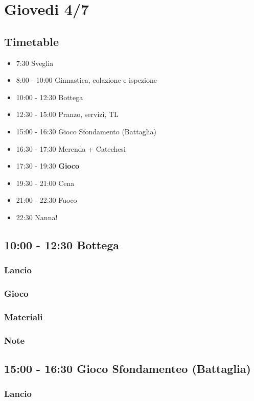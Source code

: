 \documentclass[../main.tex]{subfiles}
\begin{document}
   \section{Giovedi 4/7}
   \subsection{Timetable}
   \begin{itemize}
        \item 7:30 Sveglia
        \item 8:00 - 10:00 Ginnastica, colazione e ispezione
        \item 10:00 - 12:30 Bottega
        \item 12:30 - 15:00 Pranzo, servizi, TL
        \item 15:00 - 16:30 Gioco Sfondamento (Battaglia)
        \item 16:30 - 17:30 Merenda + Catechesi
        \item 17:30 - 19:30 \textbf{Gioco}
        \item 19:30 - 21:00 Cena
        \item 21:00 - 22:30 Fuoco
        \item 22:30 Nanna!
    \end{itemize}

   \subsection{10:00 - 12:30 Bottega}
       \subsubsection{Lancio}
        \subsubsection{Gioco}
        \subsubsection{Materiali}
        \subsubsection{Note}

    \subsection{15:00 - 16:30 Gioco Sfondamenteo (Battaglia)}
        \subsubsection{Lancio}
\end{document}
